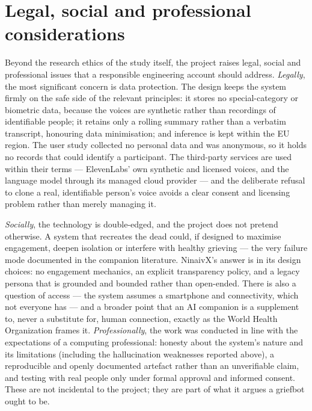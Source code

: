 \documentclass[11pt,a4paper]{report}
\begin{document}
\section{Legal, social and professional considerations}
\label{sec:lsepi}
Beyond the research ethics of the study itself, the project raises legal, social and professional issues that a responsible engineering account should address. \emph{Legally}, the most significant concern is data protection. The design keeps the system firmly on the safe side of the relevant principles: it stores no special-category or biometric data, because the voices are synthetic rather than recordings of identifiable people; it retains only a rolling summary rather than a verbatim transcript, honouring data minimisation; and inference is kept within the EU region. The user study collected no personal data and was anonymous, so it holds no records that could identify a participant. The third-party services are used within their terms --- ElevenLabs' own synthetic and licensed voices, and the language model through its managed cloud provider --- and the deliberate refusal to clone a real, identifiable person's voice avoids a clear consent and licensing problem rather than merely managing it.

\emph{Socially}, the technology is double-edged, and the project does not pretend otherwise. A system that recreates the dead could, if designed to maximise engagement, deepen isolation or interfere with healthy grieving --- the very failure mode documented in the companion literature. NinaivX's answer is in its design choices: no engagement mechanics, an explicit transparency policy, and a legacy persona that is grounded and bounded rather than open-ended. There is also a question of access --- the system assumes a smartphone and connectivity, which not everyone has --- and a broader point that an AI companion is a supplement to, never a substitute for, human connection, exactly as the World Health Organization frames it. \emph{Professionally}, the work was conducted in line with the expectations of a computing professional: honesty about the system's nature and its limitations (including the hallucination weaknesses reported above), a reproducible and openly documented artefact rather than an unverifiable claim, and testing with real people only under formal approval and informed consent. These are not incidental to the project; they are part of what it argues a griefbot ought to be.
\end{document}
